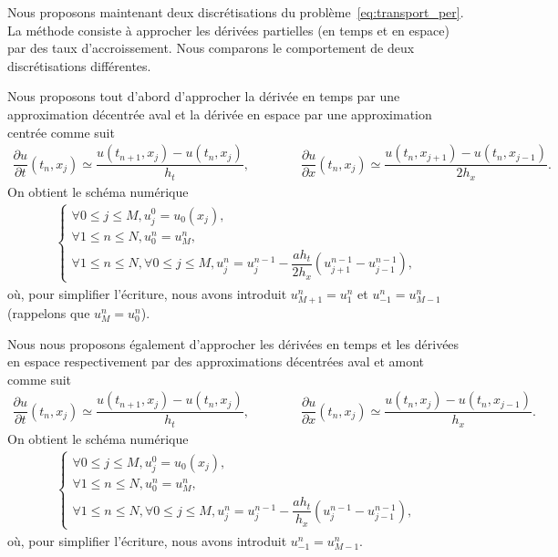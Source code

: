 \documentclass[12pt,a4paper,twoside]{article}
\begin{document}
Nous proposons maintenant deux discr\'etisations du probl\`eme~\eqref{eq:transport_per}.
La m\'ethode consiste \`a approcher les d\'eriv\'ees partielles
(en temps et en espace) par des taux d'accroissement.
Nous comparons le comportement de deux discr\'etisations diff\'erentes.


Nous proposons tout d'abord d'approcher la d\'eriv\'ee en temps par une
approximation d\'ecentr\'ee aval et la d\'eriv\'ee en espace par une 
approximation centr\'ee comme suit
\begin{align*}
  \dfrac{\partial u}{\partial t}(t_n,x_j) \simeq \dfrac{u(t_{n+1},x_j) - u(t_n,x_j)}{h_t} ,
  \qquad \qquad 
  \dfrac{\partial u}{\partial x}(t_n,x_j) \simeq \dfrac{u(t_n,x_{j+1}) - u(t_n,x_{j-1})}{2 h_x} .
\end{align*}
On obtient le sch\'ema num\'erique
\begin{align}
  \label{eq:transport_DF_centre}
  \left\{
  \begin{array}{l}
    \forall 0 \leq j \leq M , 
    u_j^0 = u_0(x_j) ,
    \\
    \forall 1 \leq n \leq N, u_0^n = u_M^n ,
    \\
    \forall 1 \leq n \leq N, \forall 0 \leq j \leq M,
    u_j^n = u_j^{n-1} - \dfrac{a h_t}{2 h_x} (u_{j+1}^{n-1} - u_{j-1}^{n-1}) ,
  \end{array}
  \right.
\end{align}
o\`u, pour simplifier l'\'ecriture, 
nous avons introduit $u_{M+1}^n = u_1^n$ et $u_{-1}^n = u_{M-1}^n$
(rappelons que $u_M^n = u_0^n$).


Nous nous proposons \'egalement d'approcher les d\'eriv\'ees en temps et les d\'eriv\'ees
en espace respectivement par des approximations d\'ecentr\'ees aval et amont comme suit
\begin{align}
  \label{eq:der_decentre_AM}
  \dfrac{\partial u}{\partial t}(t_n,x_j) \simeq \dfrac{u(t_{n+1},x_j) - u(t_n,x_j)}{h_t} ,
  \qquad \qquad 
  \dfrac{\partial u}{\partial x}(t_n,x_j) \simeq \dfrac{u(t_n,x_{j}) - u(t_n,x_{j-1})}{h_x} .
\end{align}
On obtient le sch\'ema num\'erique
\begin{align}
  \label{eq:transport_DF_decentre_AM}
  \left\{
  \begin{array}{l}
    \forall 0 \leq j \leq M , 
    u_j^0 = u_0(x_j) ,
    \\
    \forall 1 \leq n \leq N, u_0^n = u_M^n ,
    \\
    \forall 1 \leq n \leq N, \forall 0 \leq j \leq M,
    u_j^n = u_j^{n-1} - \dfrac{a h_t}{h_x} (u_{j}^{n-1} - u_{j-1}^{n-1}) ,
  \end{array}
  \right.
\end{align}
o\`u, pour simplifier l'\'ecriture, nous avons introduit $u_{-1}^n = u_{M-1}^n$.
\end{document}
